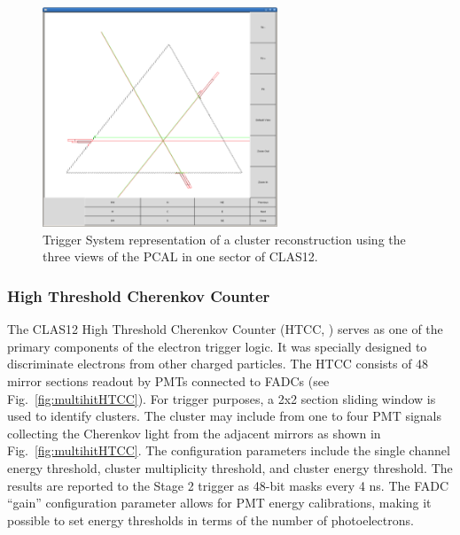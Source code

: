 \begin{figure}[htp]
	\begin{center}
		\centering
		\includegraphics[width=7cm]{img/pcal1.png}
		\caption{Trigger System representation of a cluster reconstruction using the three views of the PCAL in one sector of CLAS12.}
		\label{fig:PCAL}
	\end{center}
\end{figure} 


\subsubsection{High Threshold Cherenkov Counter}
\label{sec:HTCC}

The CLAS12 High Threshold Cherenkov Counter (HTCC, \cite{htcc-ref}) serves as one of the primary components of the electron trigger logic. It was specially designed to discriminate electrons from other charged particles. The HTCC consists of 48 mirror sections readout by PMTs connected to FADCs (see Fig.~\ref{fig:multihitHTCC}). For trigger purposes, a 2x2 section sliding window is used to identify clusters. The cluster may include from one to four PMT signals collecting the Cherenkov light from the adjacent mirrors as shown in  Fig.~\ref{fig:multihitHTCC}. The configuration parameters include the single channel energy threshold, cluster multiplicity threshold, and cluster energy threshold. The results are reported to the Stage 2 trigger as 48-bit masks every 4 ns. The FADC ``gain'' configuration parameter allows for PMT energy calibrations, making it possible to set energy thresholds in terms of the number of photoelectrons.


